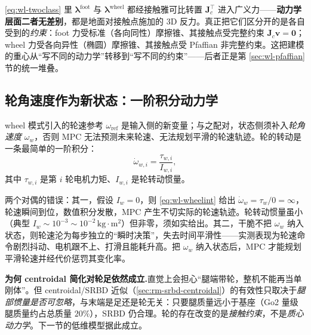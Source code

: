 \begin{insight}
\cref{eq:wl-twoclass} 里 $\boldsymbol\lambda^{\mathrm{foot}}$ 与 $\boldsymbol\lambda^{\mathrm{wheel}}$ 都经接触雅可比转置 $\mathbf{J}_c^\top$ 进入广义力——\textbf{动力学层面二者无差别}，都是地面对接触点施加的 $3$D 反力。真正把它们区分开的是各自受到的\emph{约束}：foot 力受标准（各向同性）摩擦锥、其接触点受完整约束 $\mathbf{J}_c\mathbf{v}=\mathbf{0}$；wheel 力受各向异性（椭圆）摩擦锥、其接触点受 Pfaffian 非完整约束。这把建模的重心从“写不同的动力学”转移到“写不同的约束”——后者正是第 \ref{sec:wl-pfaffian} 节的统一堆叠。
\end{insight}

\subsection{轮角速度作为新状态：一阶积分动力学}

wheel 模式引入的轮速参考 $\omega_{\mathrm{ref}}$ 是输入侧的新变量；与之配对，状态侧须补入\emph{轮角速度} $\omega_w$，否则 MPC 无法预测未来轮速、无法规划平滑的轮速轨迹。轮的转动是一条最简单的一阶积分：
\begin{equation}
  \dot{\omega}_{w,i}=\frac{\tau_{w,i}}{I_{w,i}},
  \label{eq:wl-wheelint}
\end{equation}
其中 $\tau_{w,i}$ 是第 $i$ 轮电机力矩、$I_{w,i}$ 是轮转动惯量。

\begin{pitfall}[别把轮当质点令 $I_w=0$，也别把轮速踢出状态]
两个对偶的错误：其一，假设 $I_w=0$，则 \cref{eq:wl-wheelint} 给出 $\dot\omega_w=\tau_w/0=\infty$，轮速瞬间到位，数值积分发散，MPC 产生不切实际的轮速轨迹。轮转动惯量虽小（典型 $I_w\sim10^{-3}\!\sim\!10^{-2}\,\mathrm{kg\cdot m^2}$）但非零，须如实给出。其二，干脆不把 $\omega_w$ 纳入状态，则轮速沦为每步独立的“瞬时决策”，失去时间平滑性——实测表现为轮速命令剧烈抖动、电机跟不上、打滑且能耗升高。把 $\omega_w$ 纳入状态后，MPC 才能规划平滑轮速并经代价惩罚其变化率。
\end{pitfall}

\begin{note}
\textbf{为何 centroidal 简化对轮足依然成立.}\;直觉上会担心“腿端带轮，整机不能再当单刚体”。但 centroidal/SRBD 近似（\cref{sec:rm-srbd-centroidal}）的有效性只取决于\emph{腿部惯量是否可忽略}，与末端是足还是轮无关：只要腿质量远小于基座（Go2 量级腿质量约占总质量 $20\%$），SRBD 仍合理。轮的存在改变的是\emph{接触约束}，不是\emph{质心动力学}。下一节的低维模型据此成立。
\end{note}

